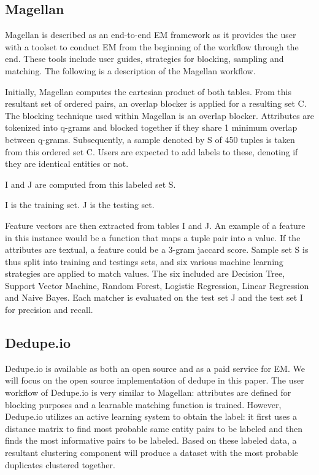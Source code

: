 \documentclass[letterpaper,twocolumn,10pt]{article}
\begin{document}
\subsection{Magellan}
Magellan is described as an end-to-end EM framework as it provides the user with a toolset to conduct EM from the beginning of the workflow through the end. These tools include user guides, strategies for blocking, sampling and matching. The following is a description of the Magellan workflow.

Initially, Magellan computes the cartesian product of both tables. From this resultant set of ordered pairs, an overlap blocker is applied for a resulting set C. The blocking technique used within Magellan is an overlap blocker. Attributes are tokenized into q-grams and blocked together if they share 1 minimum overlap between q-grams. Subsequently, a sample denoted by S of 450 tuples is taken from this ordered set C. Users are expected to add labels to these, denoting if they are identical entities or not.

I and J are computed from this labeled set S.

I is the training set. J is the testing set.

Feature vectors are then extracted from tables I and J. An example of a feature in this instance would be a function that maps a tuple pair into a value. If the attributes are textual, a feature could be a 3-gram jaccard score. Sample set S is thus split into training and testings sets, and six various machine learning strategies are applied to match values. The six included are Decision Tree, Support Vector Machine, Random Forest, Logistic Regression, Linear Regression and Naive Bayes. Each matcher is evaluated on the test set J and the test set I for precision and recall.

\subsection{Dedupe.io}
Dedupe.io is available as both an open source and as a paid service for EM. We will focus on the open source implementation of dedupe in this paper. The user workflow of Dedupe.io is very similar to Magellan: attributes are defined for blocking purposes and a learnable matching function is trained. However, Dedupe.io utilizes an active learning system to obtain the label: it first uses a distance matrix to find most probable same entity pairs to be labeled and then finds the most informative pairs to be labeled. Based on these labeled data, a resultant clustering component will produce a dataset with the most probable duplicates clustered together.  
\end{document}
